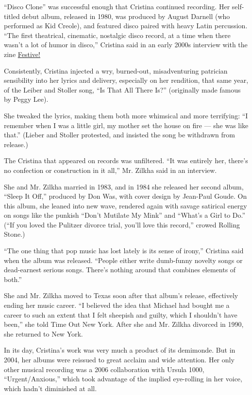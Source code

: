 ``Disco Clone'' was successful enough that Cristina continued recording.
Her self-titled debut album, released in 1980, was produced by August
Darnell (who performed as Kid Creole), and featured disco paired with
heavy Latin percussion. ``The first theatrical, cinematic, nostalgic
disco record, at a time when there wasn't a lot of humor in disco,''
Cristina said in an early 2000s interview with the zine
\href{http://festivefanzine.blogspot.com/2010/12/from-vaults-merry-cristina-mas.html}{Festive!}

Consistently, Cristina injected a wry, burned-out, misadventuring
patrician sensibility into her lyrics and delivery, especially on her
rendition, that same year, of the Leiber and Stoller song, ``Is That All
There Is?'' (originally made famous by Peggy Lee).

She tweaked the lyrics, making them both more whimsical and more
terrifying: ``I remember when I was a little girl, my mother set the
house on fire --- she was like that.'' (Lieber and Stoller protested,
and insisted the song be withdrawn from release.)

The Cristina that appeared on records was unfiltered. ``It was entirely
her, there's no confection or construction in it all,'' Mr. Zilkha said
in an interview.

She and Mr. Zilkha married in 1983, and in 1984 she released her second
album, ``Sleep It Off,'' produced by Don Was, with cover design by
Jean-Paul Goude. On this album, she leaned into new wave, rendered again
with savage satirical energy on songs like the punkish ``Don't Mutilate
My Mink'' and ``What's a Girl to Do.'' (``If you loved the Pulitzer
divorce trial, you'll love this record,'' crowed Rolling Stone.)

``The one thing that pop music has lost lately is its sense of irony,''
Cristina said when the album was released. ``People either write
dumb-funny novelty songs or dead-earnest serious songs. There's nothing
around that combines elements of both.''

She and Mr. Zilkha moved to Texas soon after that album's release,
effectively ending her music career. ``I believed the idea that Michael
had bought me a career to such an extent that I felt sheepish and
guilty, which I shouldn't have been,'' she told Time Out New York. After
she and Mr. Zilkha divorced in 1990, she returned to New York.

In its day, Cristina's work was very much a product of its demimonde.
But in 2004, her albums were reissued to great acclaim and wide
attention. Her only other musical recording was a 2006 collaboration
with Ursula 1000, ``Urgent/Anxious,'' which took advantage of the
implied eye-rolling in her voice, which hadn't diminished at all.

